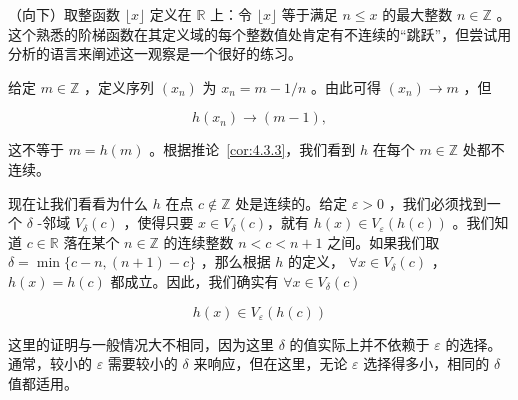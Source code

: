 \begin{Eg}
  \label{eg:4.3.7}
（向下）取整函数 \( \lfloor x\rfloor\)  定义在 $\mathbb{R}$ 上：令 \(\lfloor x\rfloor\) 等于满足 \(n \leq  x\) 的最大整数 \(n \in  \mathbb{Z}\) 。这个熟悉的阶梯函数在其定义域的每个整数值处肯定有不连续的“跳跃”，但尝试用分析的语言来阐述这一观察是一个很好的练习。

给定 \(m \in  \mathbb{Z}\) ，定义序列 \(\left( {x}_{n}\right)\) 为 \({x}_{n} = m - 1/n\) 。由此可得 \(\left( {x}_{n}\right)  \rightarrow  m\) ，但

\[
h\left( {x}_{n}\right)  \rightarrow  \left( {m - 1}\right) ,
\]

这不等于 \(m = h\left( m\right)\) 。根据推论~\ref{cor:4.3.3}，我们看到 \(h\) 在每个 \(m \in  \mathbb{Z}\) 处都不连续。

现在让我们看看为什么 \(h\) 在点 \(c \notin  \mathbb{Z}\) 处是连续的。给定 \(\varepsilon  > 0\) ，我们必须找到一个 \(\delta\) -邻域 \({V}_{\delta }\left( c\right)\) ，使得只要 \(x \in  {V}_{\delta }\left( c\right)\)，就有 \(h\left( x\right)  \in  {V}_{\varepsilon }\left( {h\left( c\right) }\right)\) 。我们知道 \(c \in  \mathbb{R}\) 落在某个 \(n \in  \mathbb{Z}\) 的连续整数 \(n < c < n + 1\) 之间。如果我们取 \(\delta  = \min \{ c - n,\left( {n + 1}\right)  - c\}\) ，那么根据 \(h\) 的定义， \(\forall x \in  {V}_{\delta }\left( c\right)\) ， \(h\left( x\right)  = h\left( c\right)\) 都成立。因此，我们确实有 $\forall x \in  {V}_{\delta }\left( c\right)$

\[
h\left( x\right)  \in  {V}_{\varepsilon }\left( {h\left( c\right) }\right)
\]

这里的证明与一般情况大不相同，因为这里 \(\delta\) 的值实际上并不依赖于 \(\varepsilon\) 的选择。通常，较小的 \(\varepsilon\) 需要较小的 \(\delta\) 来响应，但在这里，无论 \(\varepsilon\) 选择得多小，相同的 \(\delta\) 值都适用。
\end{Eg}


